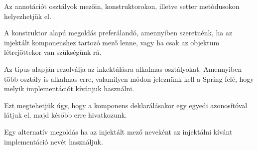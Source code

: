 Az  annotációt osztályok mezőin, konstruktorokon, illetve setter metódusokon helyezhetjük el.


A konstruktor alapú megoldás preferálandó, amennyiben szeretnénk, ha az injektált komponenshez tartozó mező  lenne, vagy ha csak az objektum létrejöttekor van szükségünk rá. \par

Az  típus alapján rezolválja az inkektálásra alkalmas osztályokat. Amennyiben több osztály is alkalmas erre, valamilyen módon jeleznünk kell a Spring felé, hogy melyik implementációt kívánjuk használni. \par

Ezt megtehetjük úgy, hogy a komponens deklarálásakor egy egyedi azonosítóval látjuk el, majd később erre hivatkozunk.


Egy alternatív megoldás ha az injektált mező neveként az injektálni kívánt implementáció nevét használjuk.


